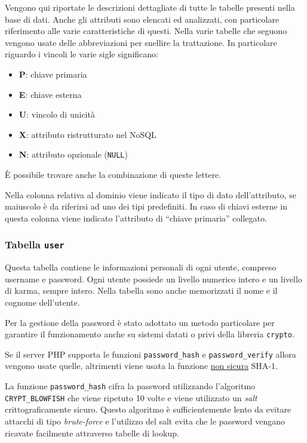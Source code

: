 Vengono qui riportate le descrizioni dettagliate di tutte le tabelle presenti nella base di dati. Anche gli attributi sono elencati ed analizzati, con particolare riferimento alle varie caratteristiche di questi. Nella varie tabelle che seguono vengono usate delle abbreviazioni per snellire la trattazione. In particolare riguardo i vincoli le varie sigle significano:

\begin{itemize}
	\item \textbf{P}: chiave primaria
	\item \textbf{E}: chiave esterna
	\item \textbf{U}: vincolo di unicità
	\item \textbf{X}: attributo ristrutturato nel NoSQL
	\item \textbf{N}: attributo opzionale (\texttt{NULL})
\end{itemize}

È possibile trovare anche la combinazione di queste lettere.

Nella colonna relativa al dominio viene indicato il tipo di dato dell'attributo, se maiuscolo è da riferirsi ad uno dei tipi predefiniti. In caso di chiavi esterne in questa colonna viene indicato l'attributo di ``chiave primaria'' collegato.

\subsubsection{Tabella \texttt{user}}

Questa tabella contiene le informazioni personali di ogni utente, compreso username e password. Ogni utente possiede un livello numerico intero e un livello di karma, sempre intero. Nella tabella sono anche memorizzati il nome e il cognome dell'utente.

Per la gestione della password è stato adottato un metodo particolare per garantire il funzionamento anche su sistemi datati o privi della libreria \texttt{crypto}. 

Se il server PHP supporta le funzioni \texttt{password\_hash} e \texttt{password\_verify} allora vengono usate quelle, altrimenti viene usata la funzione \underline{non sicura} SHA-1.

La funzione \texttt{password\_hash} cifra la password utilizzando l'algoritmo \texttt{CRYPT\_BLOWFISH} che viene ripetuto 10 volte e viene utilizzato un \emph{salt} crittograficamente sicuro. Questo algoritmo è sufficientemente lento da evitare attacchi di tipo \emph{brute-force} e l'utilizzo del salt evita che le password vengano ricavate facilmente attraverso tabelle di lookup.

